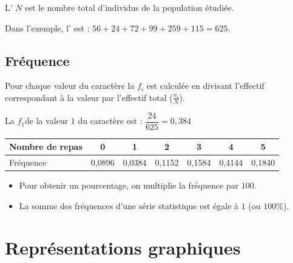 \documentclass[12pt,a4paper]{article}
\begin{document}
	\begin{mydef}
		L' $N$ est le nombre total d'individus de la population étudiée.				
	\end{mydef}	

	\begin{myex}
		Dans l'exemple, l' est : $56 + 24 + 72 + 99 + 259 + 115 = 625$.	
	\end{myex}
			

\subsection{Fréquence}

	\begin{mydef}
		Pour chaque valeur du caractère la  $f_i$ est calculée en divisant l'effectif correspondant à la valeur par l'effectif total  ($\frac{n_i}{N}$).
	\end{mydef}
	
	\begin{myex}
		La  $f_1$de la valeur $1$ du caractère est : $\dfrac{24}{625} = 0,384$ 
		
		\begin{center}
			
			
			\begin{tabular}{|@{\ }l@{\ }|@{\ }c@{\ }|@{\ }c@{\ }|@{\ }c@{\ }|@{\ }c@{\ }|@{\ }c@{\ }|@{\ }c@{\ }|}
				\hline
				Nombre de repas & 0 & 1 & 2 & 3 & 4 & 5 \\ \hline
				Fréquence & 0,0896 & 0,0384 & 0,1152 & 0,1584 & 0,4144 & 0,1840 \\ \hline
			\end{tabular}
		\end{center}
	\end{myex}
	
	\begin{myrems}
		\begin{itemize}
			\item Pour obtenir un pourcentage, on multiplie la fréquence par $100$. 
			\item La somme des fréquences d'une série statistique est égale à $1$ (ou $100\%$).
		\end{itemize}
		
	\end{myrems}

\section{Représentations graphiques}
\end{document}
